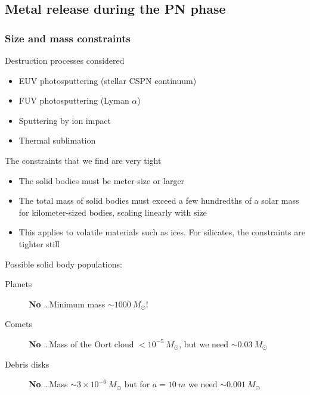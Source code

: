 \documentclass[presentation, compress]{beamer}
\providecommand{\alert}[1]{\textbf{#1}}
\begin{document}
\subsection{Metal release during the PN phase}
\begin{frame}
  \frametitle{Size and mass constraints}
  \begin{overprint}
    \begin{block}{Destruction processes considered}
      \begin{itemize}
      \item EUV photosputtering (stellar CSPN continuum)
      \item FUV photosputtering (Lyman \(\alpha\))
      \item Sputtering by ion impact
      \item Thermal sublimation
      \end{itemize}
    \end{block}
    \begin{block}{The constraints that we find are very tight}
      \begin{itemize}
      \item The solid bodies must be meter-size or larger
      \item The total mass of solid bodies must exceed a few hundredths of a solar mass for kilometer-sized bodies, scaling linearly with size
      \item This applies to volatile materials such as ices. For silicates, the constraints are tighter still
      \end{itemize}
    \end{block} 
    \begin{block}{Possible solid body populations:}
      \begin{description}
      \item[Planets] \alert{No} \dots Minimum mass \(\sim 1000~M_\odot\)!
      \item[Comets] \alert{No} \dots Mass of the Oort cloud \(< 10^{-5}~M_\odot\), but we need \(\sim 0.03~M_\odot\)
      \item[Debris disks] \alert{No} \dots Mass \(\sim 3 \times 10^{-6}~M_\odot\) but for \(a = \SI{10}{m}\) we need \(\sim 0.001~M_\odot\)
      \end{description}
    \end{block}
  \end{overprint}
\end{frame}
\end{document}
